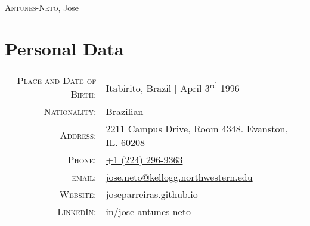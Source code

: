 \documentclass[a4paper,10pt]{article}
\begin{document}
\par{
    \centering
		{\Huge \textsc{Antunes-Neto}, Jose
	}\bigskip\par
}

\section{Personal Data}

\begin{tabular}{rp{9.75cm}}
    \textsc{Place and Date of Birth:} & Itabirito, Brazil  | April 3\textsuperscript{rd}  1996 \\
    \textsc{Nationality:} & Brazilian\\
    \textsc{Address:}   & 2211 Campus Drive, Room 4348. Evanston, IL. 60208\\
    \textsc{Phone:}     & \href{tel:+12242969363}{+1 (224) 296-9363}\\
    \textsc{email:}     & \href{mailto:jose.neto@kellogg.northwestern.edu}{jose.neto@kellogg.northwestern.edu} \\
    \textsc{Website:}   & \href{http://joseparreiras.github.io}{joseparreiras.github.io} \\
    \textsc{LinkedIn:}  & \href{https://www.linkedin.com/in/jose-antunes-neto/}{in/jose-antunes-neto}
\end{tabular}

\end{document}
